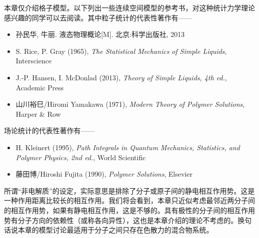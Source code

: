 \documentclass[main.tex]{subfiles}
\begin{document}
本章仅介绍格子模型。以下列出一些连续空间模型的参考书，对这种统计力学理论感兴趣的同学可以去阅读。其中粒子统计的代表性著作有——
\begin{itemize}
  \item 孙民华, 牛丽. 液态物理概论[M]. 北京:科学出版社, 2013
  \item S. Rice, P. Gray (1965), \emph{The Statistical Mechanics of Simple Liquids}, Interscience
  \item J.-P. Hansen, I. McDonlad (2013), \emph{Theory of Simple Liquids, 4th ed.}, Academic Press
  \item 山川裕巳/Hiromi Yamakawa (1971), \emph{Modern Theory of Polymer Solutions}, Harper \& Row
\end{itemize}
场论统计的代表性著作有——
\begin{itemize}
  \item H. Kleinert (1995), \emph{Path Integrals in Quantum Mechanics, Statistics, and Polymer Physics, 2nd ed.}, World Scientific
  \item 藤田博/Hiroshi Fujita (1990), \emph{Polymer Solutions}, Elsevier
\end{itemize}

所谓“非电解质”的设定，实际意思是排除了分子或原子间的静电相互作用势。这是一种作用距离比较长的相互作用。我们将会看到，本章只近似考虑最邻近两分子间的相互作用势，如果有静电相互作用，这是不够的。具有极性的分子间的相互作用势有分子方向的依赖性（或称各向异性），这也是本章介绍的理论不考虑的。换句话说本章的模型讨论最适用于分子之间只存在色散力的混合物系统。
\end{document}
